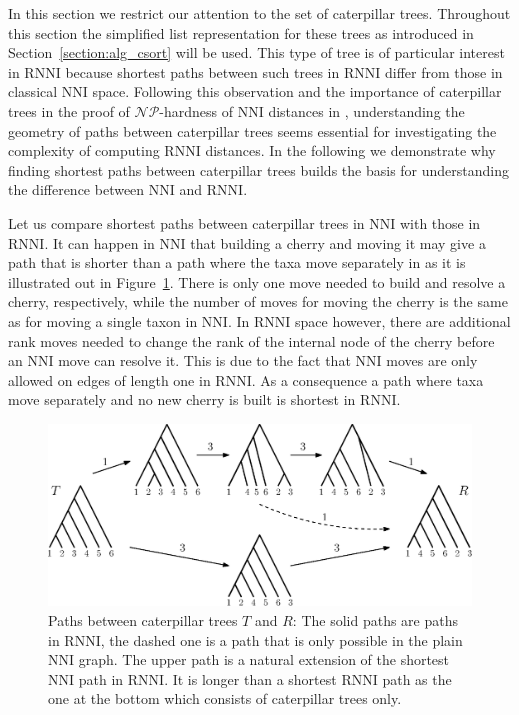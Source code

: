 \documentclass{amsart}
\newcommand{\np}{\mathcal{NP}}
\newcommand{\nni}{\mathrm{NNI}}
\newcommand{\rnni}{\mathrm{RNNI}}
\begin{document}
In this section we restrict our attention to the set of caterpillar trees.
Throughout this section the simplified list representation for these trees as introduced in Section~\ref{section:alg_csort} will be used.
This type of tree is of particular interest in $\rnni$ because shortest paths between such trees in $\rnni$ differ from those in classical $\nni$ space.
Following this observation and the importance of caterpillar trees in the proof of $\np$-hardness of $\nni$ distances in \autocite{Dasgupta2000-xa}, understanding the geometry of paths between caterpillar trees seems essential for investigating the complexity of computing $\rnni$ distances.
In the following we demonstrate why finding shortest paths between caterpillar trees builds the basis for understanding the difference between $\nni$ and $\rnni$.

Let us compare shortest paths between caterpillar trees in $\nni$ with those in $\rnni$.
It can happen in $\nni$ that building a cherry and moving it may give a path that is shorter than a path where the taxa move separately in as it is illustrated out in Figure~\ref{fig:NNI_vs_RNNI}.
There is only one move needed to build and resolve a cherry, respectively, while the number of moves for moving the cherry is the same as for moving a single taxon in $\nni$.
In $\rnni$ space however, there are additional rank moves needed to change the rank of the internal node of the cherry before an $\nni$ move can resolve it.
This is due to the fact that $\nni$ moves are only allowed on edges of length one in $\rnni$.
As a consequence a path where taxa move separately and no new cherry is built is shortest in $\rnni$.

\begin{figure}[H]
\centering
\includegraphics[width=\textwidth]{NNI_vs_RNNI}
\vspace{12pt}
\caption{Paths between caterpillar trees $T$ and $R$: The solid paths are paths in $\rnni$, the dashed one is a path that is only possible in the plain $\nni$ graph.
The upper path is a natural extension of the shortest $\nni$ path in $\rnni$.
It is longer than a shortest $\rnni$ path as the one at the bottom which consists of caterpillar trees only.}
\label{fig:NNI_vs_RNNI}
\end{figure}
\end{document}
